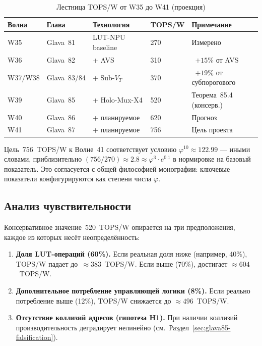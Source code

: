 \begin{table}[ht]
\centering
\caption{Лестница TOPS/W от W35 до W41 (проекция)}
\label{tab:tops-ladder}
\begin{tabular}{@{}lllll@{}}
\toprule
Волна & Глава & Технология & TOPS/W & Примечание \\
\midrule
W35 & Glava~81 & LUT-NPU baseline        & 270  & Измерено~\cite{trios882} \\
W36 & Glava~82 & + AVS                   & 310  & ~$+15\%$ от AVS \\
W37/W38 & Glava~83/84 & + Sub-$V_T$     & 370  & ~$+19\%$ от субпорогового \\
W39 & Glava~85 & + Holo-Mux-X4           & 520  & Теорема~85.4 (консерв.) \\
W40 & Glava~86 & + планируемое           & 620  & Прогноз \\
W41 & Glava~87 & + планируемое           & 756  & Цель проекта \\
\bottomrule
\end{tabular}
\end{table}

Цель~756~TOPS/W к Волне~41 соответствует условию
$\varphi^{10} \approx 122.99$ — иными словами, приблизительно
$(756/270) \approx 2.8 \approx \varphi^3 \cdot e^{0.1}$
в нормировке на базовый показатель.
Это согласуется с общей философией монографии: ключевые показатели
конфигурируются как степени числа $\varphi$.

\subsection{Анализ чувствительности}
\label{subsec:glava85-sensitivity}

Консервативное значение~520~TOPS/W опирается на три предположения,
каждое из которых несёт неопределённость:

\begin{enumerate}
  \item \textbf{Доля LUT-операций (60\%).}
        Если реальная доля ниже (например, 40\%), TOPS/W падает
        до~$\approx 383$~TOPS/W.  Если выше (70\%), достигает
        $\approx 604$~TOPS/W.

  \item \textbf{Дополнительное потребление управляющей логики (8\%).}
        Если реально потребление выше (12\%), TOPS/W снижается до
        $\approx 496$~TOPS/W.

  \item \textbf{Отсутствие коллизий адресов (гипотеза H1).}
        При наличии коллизий производительность деградирует нелинейно
        (см.\ Раздел~\ref{sec:glava85-falsification}).
\end{enumerate}

